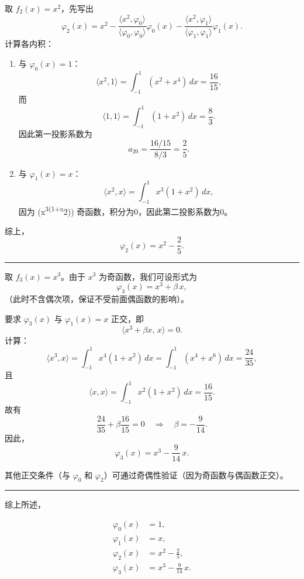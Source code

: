 \documentclass[11pt]{article}
\begin{document}
取 \(f_2(x)=x^2\)，先写出 \[
\varphi_2(x)=x^2-\frac{\langle x^2,\varphi_0\rangle}{\langle \varphi_0,\varphi_0\rangle}\varphi_0(x) - \frac{\langle x^2,\varphi_1\rangle}{\langle \varphi_1,\varphi_1\rangle}\varphi_1(x).
\] 计算各内积：

\begin{enumerate}
\def\labelenumi{\arabic{enumi}.}
\item
  与 \(\varphi_0(x)=1\)： \[
  \langle x^2,1\rangle=\int_{-1}^{1}(x^2+x^4)\,dx =\frac{16}{15},
  \] 而 \[
  \langle 1,1\rangle=\int_{-1}^{1}(1+x^2)\,dx = \frac{8}{3}.
  \] 因此第一投影系数为 \[
  a_{20}=\frac{16/15}{8/3}=\frac{2}{5}.
  \]
\item
  与 \(\varphi_1(x)=x\)： \[
  \langle x^2,x\rangle=\int_{-1}^{1}x^3(1+x^2)\,dx,
  \] 因为 (x\textsuperscript{3(1+x}2))
  奇函数，积分为0，因此第二投影系数为0。
\end{enumerate}

综上， \[
\varphi_2(x)=x^2-\frac{2}{5}.
\]

\begin{center}\rule{0.5\linewidth}{0.5pt}\end{center}

取 \(f_3(x)=x^3\)。由于 \(x^3\) 为奇函数，我们可设形式为 \[
\varphi_3(x)=x^3+ \beta\,x,
\] （此时不含偶次项，保证不受前面偶函数的影响）。

要求 \(\varphi_3(x)\) 与 \(\varphi_1(x)=x\) 正交，即 \[
\langle x^3+\beta x,\, x\rangle=0.
\] 计算： \[
\langle x^3, x\rangle=\int_{-1}^{1}x^4(1+x^2)\,dx=\int_{-1}^{1}(x^4+x^6)\,dx =\frac{24}{35},
\] 且 \[
\langle x, x\rangle=\int_{-1}^{1}x^2(1+x^2)\,dx=\frac{16}{15}.
\] 故有 \[
\frac{24}{35}+\beta\frac{16}{15}=0\quad\Longrightarrow\quad \beta=-\frac{9}{14}.
\] 因此， \[
\varphi_3(x)= x^3-\frac{9}{14}\,x.
\]

其他正交条件（与 \(\varphi_0\) 和
\(\varphi_2\)）可通过奇偶性验证（因为奇函数与偶函数正交）。

\begin{center}\rule{0.5\linewidth}{0.5pt}\end{center}

综上所述，

\[
\begin{aligned}
\varphi_0(x)&=1,\\[1mm]
\varphi_1(x)&=x,\\[1mm]
\varphi_2(x)&=x^2-\frac{2}{5},\\[1mm]
\varphi_3(x)&=x^3-\frac{9}{14}\,x.
\end{aligned}
\]
\end{document}
